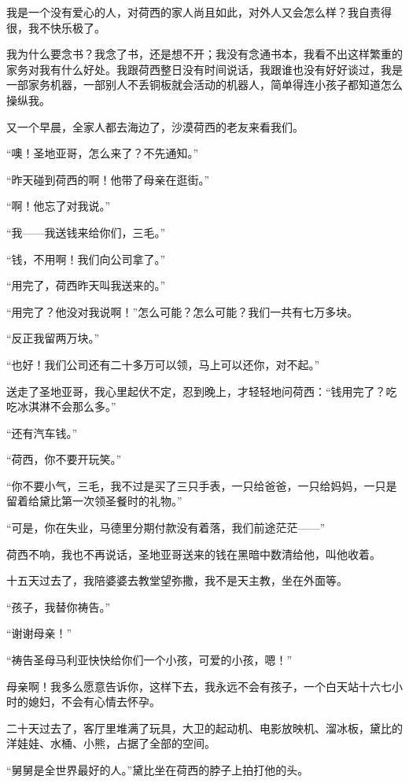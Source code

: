 \par 我是一个没有爱心的人，对荷西的家人尚且如此，对外人又会怎么样？我自责得很，我不快乐极了。
\par 我为什么要念书？我念了书，还是想不开；我没有念通书本，我看不出这样繁重的家务对我有什么好处。我跟荷西整日没有时间说话，我跟谁也没有好好谈过，我是一部家务机器，一部别人不丢铜板就会活动的机器人，简单得连小孩子都知道怎么操纵我。
\par 又一个早晨，全家人都去海边了，沙漠荷西的老友来看我们。
\par “噢！圣地亚哥，怎么来了？不先通知。”
\par “昨天碰到荷西的啊！他带了母亲在逛街。”
\par “啊！他忘了对我说。”
\par “我——我送钱来给你们，三毛。”
\par “钱，不用啊！我们向公司拿了。”
\par “用完了，荷西昨天叫我送来的。”
\par “用完了？他没对我说啊！”怎么可能？怎么可能？我们一共有七万多块。
\par “反正我留两万块。”
\par “也好！我们公司还有二十多万可以领，马上可以还你，对不起。”
\par 送走了圣地亚哥，我心里起伏不定，忍到晚上，才轻轻地问荷西：“钱用完了？吃吃冰淇淋不会那么多。”
\par “还有汽车钱。”
\par “荷西，你不要开玩笑。”
\par “你不要小气，三毛，我不过是买了三只手表，一只给爸爸，一只给妈妈，一只是留着给黛比第一次领圣餐时的礼物。”
\par “可是，你在失业，马德里分期付款没有着落，我们前途茫茫——”
\par 荷西不响，我也不再说话，圣地亚哥送来的钱在黑暗中数清给他，叫他收着。
\par 十五天过去了，我陪婆婆去教堂望弥撒，我不是天主教，坐在外面等。
\par “孩子，我替你祷告。”
\par “谢谢母亲！”
\par “祷告圣母马利亚快快给你们一个小孩，可爱的小孩，嗯！”
\par 母亲啊！我多么愿意告诉你，这样下去，我永远不会有孩子，一个白天站十六七小时的媳妇，不会有心情去怀孕。
\par 二十天过去了，客厅里堆满了玩具，大卫的起动机、电影放映机、溜冰板，黛比的洋娃娃、水桶、小熊，占据了全部的空间。
\par “舅舅是全世界最好的人。”黛比坐在荷西的脖子上拍打他的头。
